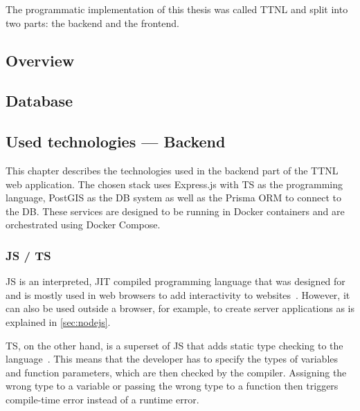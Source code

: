 The programmatic implementation of this thesis was called \acf{TTNL} and split into two parts: the backend and the frontend.

\subsection{Overview}



\subsection{Database}


\subsection{Used technologies --- Backend}

This chapter describes the technologies used in the backend part of the \ac{TTNL} web application.
The chosen stack uses Express.js with \ac{TS} as the programming language, PostGIS as the \ac{DB} system as well as the Prisma \ac{ORM} to connect to the \ac{DB}.
These services are designed to be running in Docker containers and are orchestrated using Docker Compose.

\subsubsection{\acf{JS} / \acf{TS}}

\ac{JS} is an interpreted, \ac{JIT} compiled programming language that was designed for and is mostly used in web browsers to add interactivity to websites~\cite{mdn_javascript_2023}.
However, it can also be used outside a browser, for example, to create server applications as is explained in \cref{sec:nodejs}.

\ac{TS}, on the other hand, is a superset of \ac{JS} that adds static type checking to the language~\cite{microsoft_javascript_nodate}.
This means that the developer has to specify the types of variables and function parameters, which are then checked by the compiler.
Assigning the wrong type to a variable or passing the wrong type to a function then triggers compile-time error instead of a runtime error.

